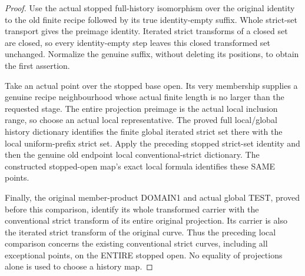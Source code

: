 \begin{proof}
Use the actual stopped full-history isomorphism over the original identity
to the old finite recipe followed by its true identity-empty suffix.
Whole strict-set transport gives the preimage identity. Iterated strict
transforms of a closed set are closed, so every identity-empty step leaves
this closed transformed set unchanged. Normalize the genuine suffix,
without deleting its positions, to obtain the first assertion.

Take an actual point over the stopped base open. Its very membership
supplies a genuine recipe neighbourhood whose actual finite length is no
larger than the requested stage. The entire projection preimage is the
actual local inclusion range, so choose an actual local representative.
The proved full local/global history dictionary identifies the finite
global iterated strict set there with the local uniform-prefix strict
set. Apply the preceding stopped strict-set identity and then the genuine
old endpoint local conventional-strict dictionary. The constructed
stopped-open map's exact local formula identifies these SAME points.

Finally, the original member-product DOMAIN1 and actual global TEST,
proved before this comparison, identify its whole transformed carrier
with the conventional strict transform of its entire original projection.
Its carrier is also the iterated strict transform of the original curve.
Thus the preceding local comparison concerns the existing conventional
strict curves, including all exceptional points, on the ENTIRE stopped
open. No equality of projections alone is used to choose a history map.
\end{proof}

